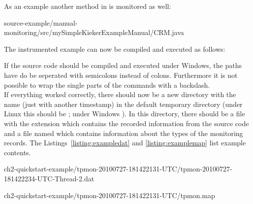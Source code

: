 As an example another method in  is monitored as well:

\setJavaCodeListing
%
{source-example/manual-monitoring/src/mySimpleKiekerExampleManual/CRM.java}

The instrumented example can now be compiled and executed as follows:

\setBashListing 		
			

\warning If the source code should be compiled and executed under Windows, the %
paths have do be seperated with semicolons instead of colons. Furthermore it is %
not possible to wrap the single parts of the commands with a backslash.\\
If everything worked correctly, there should now be a new directory with the %
name  (just with another timestamp) in the default %
temporary directory (under Linux this should be ; under Windows %
). In this directory, there should be a file with the extension %
 which contains the recorded information from the source code and %
a file named  which contains information about the types of the %
monitoring records. %
The Listings~\ref{listing:exampledat} and \ref{listing:examplemap} list example %
contents. 


\setBashListing
%
{ch2-quickstart-example/tpmon-20100727-181422131-UTC/tpmon-20100727-181422234-UTC-Thread-2.dat}

%
{ch2-quickstart-example/tpmon-20100727-181422131-UTC/tpmon.map}


